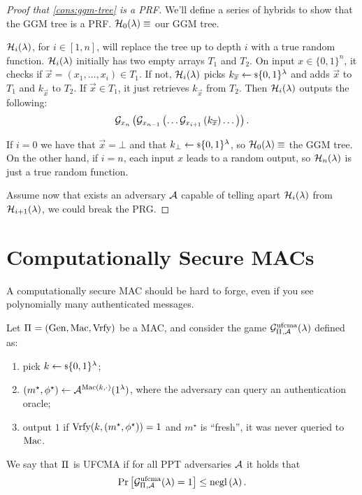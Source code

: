 \begin{proof}[Proof that \cref{cons:ggm-tree} is a \acs{PRF}]
	We'll define a series of hybrids to show that the \ac{GGM} tree is a \ac{PRF}.
	$\mathcal{H}_0(\lambda) \equiv$ our \ac{GGM} tree.

	$\mathcal{H}_i(\lambda)$, for $i \in [1, n]$, will replace the tree up to depth $i$ with a true random function.
	$\mathcal{H}_i(\lambda)$ initially has two empty arrays $T_1$ and $T_2$.
	On input $x \in \{0,1\}^{n}$, it checks if $\vec{x} = (x_1, \dots, x_i) \in T_1$.
	If not, $\mathcal{H}_i(\lambda)$ picks $k_{\overline{x}} \leftarrow {\scriptstyle \$} {\{0,1\}^{\lambda}}$ and adds $\vec{x}$ to $T_1$ and $k_{\vec{x}}$ to $T_2$.
	If $\vec{x} \in T_1$, it just retrieves $k_{\vec{x}}$ from $T_2$.
	Then $\mathcal{H}_i(\lambda)$ outputs the following:
	\begin{equation*}
		\mathcal{G}_{x_n} \left( \mathcal{G}_{x_{n-1}} \left( \dots \mathcal{G}_{x_{i+1}} \left( k_{\overline{x}} \right) \dots \right) \right).
	\end{equation*}

	If $i = 0$ we have that $\vec{x} = \bot$ and that $k_{\bot} \leftarrow {\scriptstyle \$} {\{0,1\}^{\lambda}}$, so $\mathcal{H}_{0}(\lambda) \equiv$ the \ac{GGM} tree.
	On the other hand, if $i = n$, each input $x$ leads to a random output, so $\mathcal{H}_{n}(\lambda)$ is just a true random function.

	Assume now that exists an adversary $\mathcal{A}$ capable of telling apart $\mathcal{H}_{i}(\lambda)$ from $\mathcal{H}_{i+1}(\lambda)$, we could break the \ac{PRG}.
\end{proof}

\section{Computationally Secure \acsp{MAC}}

A computationally secure \ac{MAC} should be hard to forge, even if you see polynomially many authenticated messages.

\begin{definition}
	Let $\Pi_{} = \left( \mathrm{Gen}, \allowbreak \mathrm{Mac}, \allowbreak \mathrm{Vrfy} \right)$ be a \ac{MAC}, and consider the game $\mathcal{G}^{\scriptstyle \text{ufcma}}_{\Pi_{},\mathcal{A}}(\lambda)$ defined as:
	\begin{enumerate}
		\item pick $k \leftarrow {\scriptstyle \$} {\{0,1\}^{\lambda}}$;
		\item $(m^{\star}, \phi^{\star}) \leftarrow \mathcal{A}^{\mathrm{Mac}(k, \cdot)}(1^{\lambda})$, where the adversary can query an authentication oracle;
		\item output $1$ if $\mathrm{Vrfy}(k, (m^{\star}, \phi^{\star})) = 1$ and $m^{\star}$ is ``fresh'', \ie it was never queried to $\mathrm{Mac}$.
	\end{enumerate}
	We say that $\Pi_{}$ is \ac{UFCMA} if for all \ac{PPT} adversaries $\mathcal{A}$ it holds that
	\begin{equation*}
		\mathop{\mathrm{Pr}}\limits_{} \left[ {\mathcal{G}^{\scriptstyle \text{ufcma}}_{\Pi_{},\mathcal{A}} (\lambda) = 1} \right] \le \mathrm{negl}\left({\lambda}\right). \qedhere
	\end{equation*}
\end{definition}

